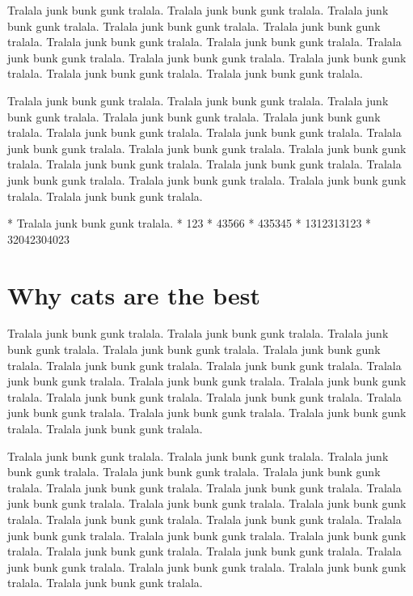 \documentclass{book}
\begin{document}
Tralala junk bunk gunk tralala. Tralala junk bunk gunk tralala. Tralala junk bunk gunk tralala. Tralala junk bunk gunk tralala. Tralala junk bunk gunk tralala. Tralala junk bunk gunk tralala. Tralala junk bunk gunk tralala. Tralala junk bunk gunk tralala. Tralala junk bunk gunk tralala. Tralala junk bunk gunk tralala. Tralala junk bunk gunk tralala. Tralala junk bunk gunk tralala. 

Tralala junk bunk gunk tralala. Tralala junk bunk gunk tralala. Tralala junk bunk gunk tralala. Tralala junk bunk gunk tralala. Tralala junk bunk gunk tralala. Tralala junk bunk gunk tralala. Tralala junk bunk gunk tralala. Tralala junk bunk gunk tralala. Tralala junk bunk gunk tralala. Tralala junk bunk gunk tralala. Tralala junk bunk gunk tralala. Tralala junk bunk gunk tralala. Tralala junk bunk gunk tralala. Tralala junk bunk gunk tralala. Tralala junk bunk gunk tralala. Tralala junk bunk gunk tralala. 

* Tralala junk bunk gunk tralala. 
* 123
* 43566
  * 435345
  * 1312313123
* 32042304023



\chapter{Why cats are the best}

Tralala junk bunk gunk tralala. Tralala junk bunk gunk tralala. Tralala junk bunk gunk tralala. Tralala junk bunk gunk tralala. Tralala junk bunk gunk tralala. Tralala junk bunk gunk tralala. Tralala junk bunk gunk tralala. Tralala junk bunk gunk tralala. Tralala junk bunk gunk tralala. Tralala junk bunk gunk tralala. Tralala junk bunk gunk tralala. Tralala junk bunk gunk tralala. Tralala junk bunk gunk tralala. Tralala junk bunk gunk tralala. Tralala junk bunk gunk tralala. Tralala junk bunk gunk tralala. 

Tralala junk bunk gunk tralala. Tralala junk bunk gunk tralala. Tralala junk bunk gunk tralala. Tralala junk bunk gunk tralala. Tralala junk bunk gunk tralala. Tralala junk bunk gunk tralala. Tralala junk bunk gunk tralala. Tralala junk bunk gunk tralala. Tralala junk bunk gunk tralala. Tralala junk bunk gunk tralala. Tralala junk bunk gunk tralala. Tralala junk bunk gunk tralala. Tralala junk bunk gunk tralala. Tralala junk bunk gunk tralala. Tralala junk bunk gunk tralala. Tralala junk bunk gunk tralala. Tralala junk bunk gunk tralala. Tralala junk bunk gunk tralala. Tralala junk bunk gunk tralala. Tralala junk bunk gunk tralala. Tralala junk bunk gunk tralala. 
\end{document}
